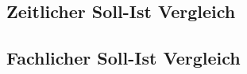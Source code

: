 \documentclass[11pt, a4paper]{article}
\begin{document}
    \subsection{Zeitlicher Soll-Ist Vergleich}
      
      \newpage

    \subsection{Fachlicher Soll-Ist Vergleich}
      
      \label{LastPageOfBackMatter}~
      \newpage
\end{document}
